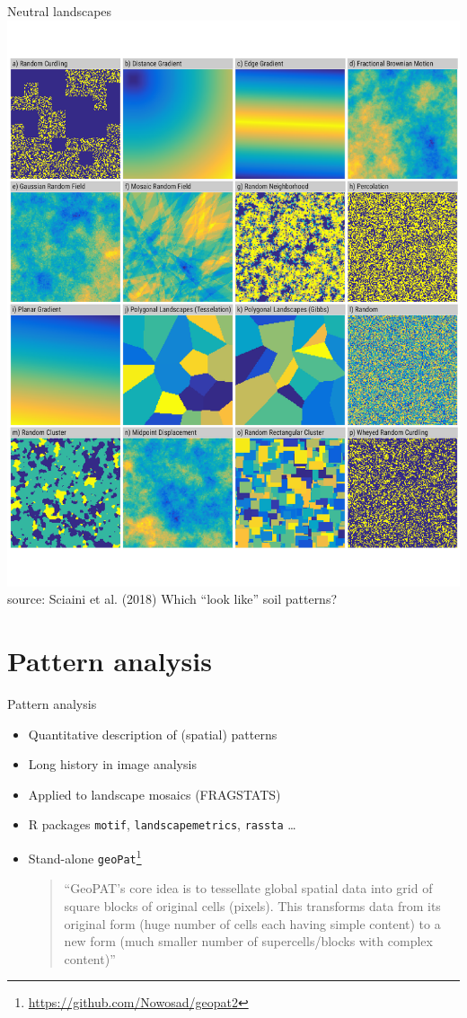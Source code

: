 \documentclass[aspectratio=169]{beamer}
\begin{document}
\begin{frame}{Neutral landscapes}
        \includegraphics[height=0.65
        \textheight]{graphics_david/marcosci-Sciaini_et_al_2018-e3aa0ce_bestiary.pdf}
\\source: Sciaini et al. (2018)
    \hfill
    Which ``look like'' soil patterns?
\end{frame}

\section{Pattern analysis}

\begin{frame}{Pattern analysis}
    \begin{itemize}
        \item Quantitative description of (spatial) patterns
        \item Long history in image analysis
        \item Applied to landscape mosaics (FRAGSTATS)
        \item R packages  \texttt{motif}, \texttt{landscapemetrics}, \texttt{rassta} \ldots
        \item Stand-alone \texttt{geoPat}\footnote{\url{https://github.com/Nowosad/geopat2}}
\begin{quote}
\scriptsize
    ``GeoPAT’s core idea is to tessellate global spatial data into grid of square blocks of original cells (pixels). This transforms data from its original form (huge number of cells each having simple content) to a new form (much smaller number of supercells/blocks with complex content)''
\end{quote}
   \end{itemize}
\end{frame}
\end{document}
